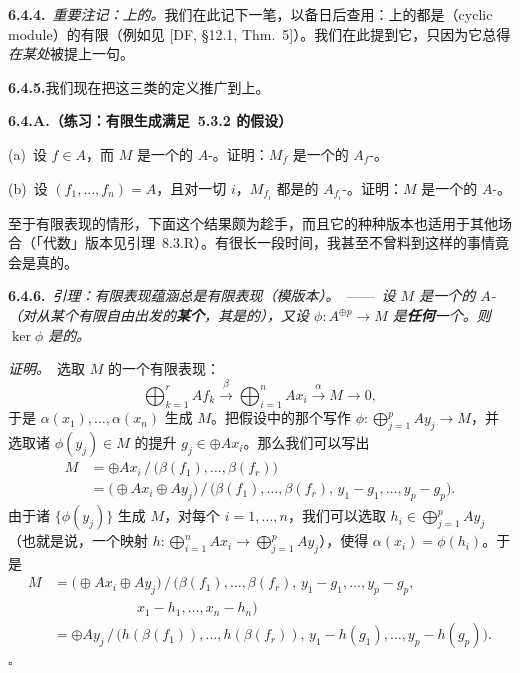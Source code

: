 \textbf{6.4.4.}\ \emph{重要注记：\trPID{}上的\trFinitelyGenerated{}\trModule。}\quad 我们在此记下一笔，以备日后查用：\trPID{}上的\trFinitelyGenerated{}\trModule{}都是\trCyclicModule{}（cyclic module）的有限\trDirectSum（例如见 [DF, \S12.1, Thm.~5]）。我们在此提到它，只因为它总得\emph{在某处}被提上一句。

\textbf{6.4.5.}\quad 我们现在把这三类\trModule{}的定义推广到\trQCSheaf{}上。

\textbf{6.4.A.（练习：有限生成满足\trAffineCommunicationLemma{}~5.3.2 的假设）}\quad

(a)~设 $f\in A$，而 $M$ 是一个\trFinitelyGenerated{}的 $A$-\trModule。证明：$M_f$ 是一个\trFinitelyGenerated{}的 $A_f$-\trModule。

(b)~设 $(f_1,\dots,f_n)=A$，且对一切 $i$，$M_{f_i}$ 都是\trFinitelyGenerated{}的 $A_{f_i}$-\trModule。证明：$M$ 是一个\trFinitelyGenerated{}的 $A$-\trModule。

至于有限表现的情形，下面这个结果颇为趁手，而且它的种种版本也适用于其他场合（「代数」版本见引理~8.3.R）。有很长一段时间，我甚至不曾料到这样的事情竟会是真的。

\textbf{6.4.6.}\ \emph{引理：有限表现蕴涵总是有限表现（模版本）。}\ ——\ \emph{设 $M$ 是一个\trFinitelyPresented{}的 $A$-\trModule{}（对从某个有限自由\trModule{}出发的\textbf{某个}\trSurjectiveMap，其\trKernel{}是\trFinitelyGenerated{}的），又设 $\phi\colon A^{\oplus p}\to M$ 是\textbf{任何}一个\trSurjectiveMap。则 $\ker\phi$ 是\trFinitelyGenerated{}的。}

\emph{证明。}\ 选取 $M$ 的一个有限表现：
\[
\bigoplus_{k=1}^{r} Af_k\overset{\beta}{\longrightarrow}\bigoplus_{i=1}^{n} Ax_i\overset{\alpha}{\longrightarrow}M\longrightarrow 0,
\]
于是 $\alpha(x_1),\dots,\alpha(x_n)$ 生成 $M$。把假设中的那个\trSurjectiveMap{}写作 $\phi\colon\bigoplus_{j=1}^{p}Ay_j\to M$，并选取诸 $\phi(y_j)\in M$ 的提升 $g_j\in\oplus Ax_i$。那么我们可以写出
\begin{align*}
M &= \oplus Ax_i \,/\, \bigl(\beta(f_1),\dots,\beta(f_r)\bigr)\\
&= \bigl(\oplus Ax_i\oplus Ay_j\bigr) \,/\, \bigl(\beta(f_1),\dots,\beta(f_r),\, y_1-g_1,\dots,y_p-g_p\bigr).
\end{align*}
由于诸 $\{\phi(y_j)\}$ 生成 $M$，对每个 $i=1,\dots,n$，我们可以选取 $h_i\in\bigoplus_{j=1}^{p}Ay_j$（也就是说，一个映射 $h\colon\bigoplus_{i=1}^{n}Ax_i\to\bigoplus_{j=1}^{p}Ay_j$），使得 $\alpha(x_i)=\phi(h_i)$。于是
\begin{align*}
M &= \bigl(\oplus Ax_i\oplus Ay_j\bigr) \,/\, \bigl(\beta(f_1),\dots,\beta(f_r),\, y_1-g_1,\dots,y_p-g_p,\\
&\qquad\qquad\qquad x_1-h_1,\dots,x_n-h_n\bigr)\\
&= \oplus Ay_j \,/\, \bigl(h(\beta(f_1)),\dots,h(\beta(f_r)),\, y_1-h(g_1),\dots,y_p-h(g_p)\bigr).
\end{align*}
\hfill$\square$

